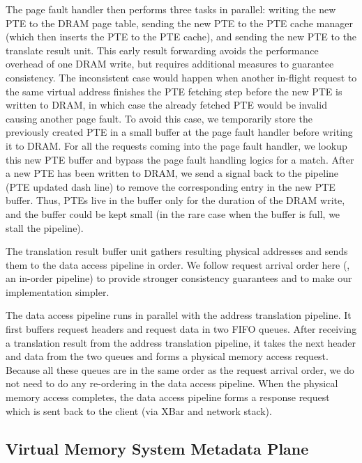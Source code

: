 The page fault handler then performs three tasks in parallel: 
writing the new PTE to the DRAM page table, sending the new PTE to the PTE cache manager (which then inserts the PTE to the PTE cache),
and sending the new PTE to the translate result unit.
This early result forwarding avoids the performance overhead of one DRAM write,
but requires additional measures to guarantee consistency.
The inconsistent case would happen when another in-flight request to the same virtual address 
finishes the PTE fetching step before the new PTE is written to DRAM,
in which case the already fetched PTE would be invalid causing another page fault.
To avoid this case, %
we temporarily store the previously created PTE in a small buffer at the page fault handler before writing it to DRAM.
For all the requests coming into the page fault handler, we lookup this new PTE buffer 
and bypass the page fault handling logics for a match.
After a new PTE has been written to DRAM, we send a signal back to the pipeline (PTE updated dash line)
to remove the corresponding entry in the new PTE buffer.
Thus, PTEs live in the buffer only for the duration of the DRAM write, and the buffer could be kept small 
(in the rare case when the buffer is full, we stall the pipeline).

The translation result buffer unit gathers resulting physical addresses and sends them to the data access pipeline in order.
We follow request arrival order here (\ie, an in-order pipeline) to provide stronger consistency guarantees
and to make our implementation simpler. 

The data access pipeline runs in parallel with the address translation pipeline.
It first buffers request headers and request data in two FIFO queues.
After receiving a translation result from the address translation pipeline, 
it takes the next header and data from the two queues and forms a physical memory access request.
Because all these queues are in the same order as the request arrival order, 
we do not need to do any re-ordering in the data access pipeline.
When the physical memory access completes, 
the data access pipeline forms a response request which is sent back to the client (via XBar and network stack).

\subsection{Virtual Memory System Metadata Plane}
\label{sec:metadataplane}

